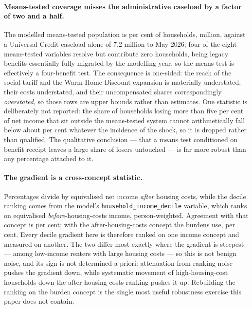 \paragraph{Means-tested coverage misses the administrative caseload by a factor of two and a half.} The modelled means-tested population is \genMeansTestedShareHouseholds{} per cent of households, \genMeansTestedHouseholdsM{} million, against a Universal Credit caseload alone of 7.2 million to May 2026; four of the eight means-tested variables resolve but contribute zero households, being legacy benefits essentially fully migrated by the modelling year, so the means test is effectively a four-benefit test. The consequence is one-sided: the reach of the social tariff and the Warm Home Discount expansion is materially understated, their costs understated, and their uncompensated shares correspondingly \emph{overstated}, so those rows are upper bounds rather than estimates. One statistic is deliberately not reported: the share of households losing more than five per cent of net income that sit outside the means-tested system cannot arithmetically fall below about \genLargeLoserCeilingPct{} per cent whatever the incidence of the shock, so it is dropped rather than qualified. The qualitative conclusion --- that a means test conditioned on benefit receipt leaves a large share of losers untouched --- is far more robust than any percentage attached to it.

\paragraph{The gradient is a cross-concept statistic.} Percentages divide by equivalised net income \emph{after} housing costs, while the decile ranking comes from the model's \texttt{household\_income\_decile} variable, which ranks on equivalised \emph{before}-housing-costs income, person-weighted. Agreement with that concept is \genDecileRankAgreementPct{} per cent; with the after-housing-costs concept the burdens use, \genDecileRankAgreementEquivAhcPrecisePct{} per cent. Every decile gradient here is therefore ranked on one income concept and measured on another. The two differ most exactly where the gradient is steepest --- among low-income renters with large housing costs --- so this is not benign noise, and its sign is not determined a priori: attenuation from ranking noise pushes the gradient down, while systematic movement of high-housing-cost households down the after-housing-costs ranking pushes it up. Rebuilding the ranking on the burden concept is the single most useful robustness exercise this paper does not contain.

